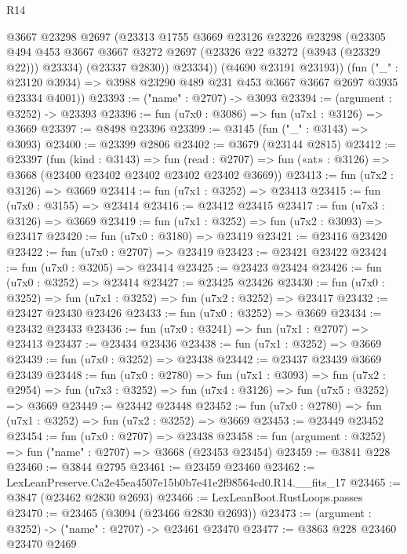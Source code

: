 \begin{lexlean}{R14}
\begin{coremodule}
            @3667
            @23298
            @2697
            (@23313
              @1755
              @3669
              @23126
              @23226
              @23298
              (@23305
                @494
                @453
                @3667
                @3667
                @3272
                @2697
                (@23326 @22 @3272 (@3943 (@23329 @22)))
                @23334)
              (@23337 @2830))
            @23334))
        (@4690 @23191 @23193))
      (fun ("_" : @23120 @3934) =>
      @3988 @23290 @489 @231 @453 @3667 @3667 @2697 @3935 @23334 @4001))
@23393 := ("name" : @2707) -> @3093
@23394 := (argument : @3252) -> @23393
@23396 := fun (u7x0 : @3086) => fun (u7x1 : @3126) => @3669
@23397 := @8498 @23396
@23399 := @3145 (fun ("_" : @3143) => @3093)
@23400 := @23399 @2806
@23402 := @3679 (@23144 @2815)
@23412 := @23397
    (fun (kind : @3143) =>
    fun (read : @2707) => fun («at» : @3126) => @3668 (@23400 @23402 @23402 @23402 @23402 @3669))
@23413 := fun (u7x2 : @3126) => @3669
@23414 := fun (u7x1 : @3252) => @23413
@23415 := fun (u7x0 : @3155) => @23414
@23416 := @23412 @23415
@23417 := fun (u7x3 : @3126) => @3669
@23419 := fun (u7x1 : @3252) => fun (u7x2 : @3093) => @23417
@23420 := fun (u7x0 : @3180) => @23419
@23421 := @23416 @23420
@23422 := fun (u7x0 : @2707) => @23419
@23423 := @23421 @23422
@23424 := fun (u7x0 : @3205) => @23414
@23425 := @23423 @23424
@23426 := fun (u7x0 : @3252) => @23414
@23427 := @23425 @23426
@23430 := fun (u7x0 : @3252) => fun (u7x1 : @3252) => fun (u7x2 : @3252) => @23417
@23432 := @23427 @23430 @23426
@23433 := fun (u7x0 : @3252) => @3669
@23434 := @23432 @23433
@23436 := fun (u7x0 : @3241) => fun (u7x1 : @2707) => @23413
@23437 := @23434 @23436
@23438 := fun (u7x1 : @3252) => @3669
@23439 := fun (u7x0 : @3252) => @23438
@23442 := @23437 @23439 @3669 @23439
@23448 := fun (u7x0 : @2780) =>
  fun (u7x1 : @3093) =>
  fun (u7x2 : @2954) => fun (u7x3 : @3252) => fun (u7x4 : @3126) => fun (u7x5 : @3252) => @3669
@23449 := @23442 @23448
@23452 := fun (u7x0 : @2780) => fun (u7x1 : @3252) => fun (u7x2 : @3252) => @3669
@23453 := @23449 @23452
@23454 := fun (u7x0 : @2707) => @23438
@23458 := fun (argument : @3252) => fun ("name" : @2707) => @3668 (@23453 @23454)
@23459 := @3841 @228
@23460 := @3844 @2795
@23461 := @23459 @23460
@23462 := LexLeanPreserve.Ca2e45ea4507e15b0b7e41e2f98564cd0.R14.__fits_17
@23465 := @3847 (@23462 @2830 @2693)
@23466 := LexLeanBoot.RustLoops.passes
@23470 := @23465 (@3094 (@23466 @2830 @2693))
@23473 := (argument : @3252) -> ("name" : @2707) -> @23461 @23470
@23477 := @3863 @228 @23460 @23470 @2469

\end{coremodule}
\end{lexlean}
